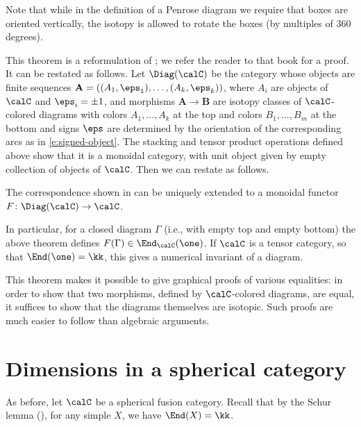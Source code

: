 Note that while in the definition of a Penrose diagram we require that boxes
are oriented vertically, the isotopy is allowed to rotate the boxes (by
multiples of 360 degrees).

This theorem is a reformulation of \cite[Theorem 2.6]{turaev-virelizier}; we
refer the reader to that book for a proof. It can
be restated as follows. Let $\Diag(\calC)$ be the category whose objects are finite
sequences $\mathbf{A}=((A_1, \eps_1), \dots, (A_k, \eps_k))$, where $A_i$ are
objects of $\calC$ and $\eps_i=\pm 1$, and morphisms $\mathbf{A}\to \mathbf{B}$
are isotopy classes of $\calC$-colored diagrams with colors $A_1, \dots, A_k$ at
the top and colors $B_1, \dots, B_m$ at the bottom and signs $\eps$ are
determined by the orientation of the corresponding arcs as in
\eqref{e:signed-object}. The stacking and tensor product operations defined
above show that it is a monoidal category, with unit object given by empty
collection of objects of $\calC$. Then we can restate
 as follows.

\begin{theorem}\label{t:graphical-calculus2}
  The correspondence shown in  can be uniquely extended to
  a monoidal functor $F\colon \Diag(\calC)\to \calC$.
\end{theorem}


In particular, for a closed diagram $\Gamma$ (i.e., with empty top and empty
bottom) the above theorem defines $F(\Gamma)\in \End_\calC(\one)$. If $\calC$
is a tensor category, so that $\End(\one)=\kk$, this gives a numerical invariant
of a diagram.

This theorem makes it possible to give graphical proofs of various equalities:
in order to show that two morphisms, defined by $\calC$-colored diagrams, are
equal, it suffices to show that the diagrams themselves are isotopic. Such
proofs are much easier to follow than algebraic arguments.






\section{Dimensions in a spherical category}\label{s:spherical-basic}

As before, let $\calC$ be a spherical fusion category.
Recall that by the Schur lemma (),
for any simple $X$, we have $\End(X)=\kk$.

